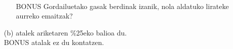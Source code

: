 \documentclass[10pt]{article}              %
\begin{document}
\begin{enumerate}
\begin{enumerate}
\begin{flushright}
\begin{minipage}[c]{0.75\textwidth}
\end{minipage}
\\

\end{flushright}
\item[BONUS] Gordailuetako gasak berdinak izanik, nola aldatuko lirateke aurreko emaitzak?
\end{enumerate}

\item[]
\item[]
\item[] (b) atalek ariketaren \%25eko balioa du.\\
  BONUS atalak ez du kontatzen.

\end{enumerate}
%


\end{document}
